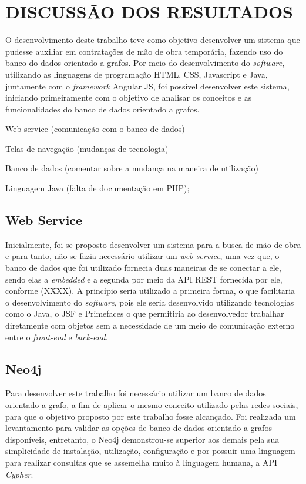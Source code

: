 
\chapter{DISCUSSÃO DOS RESULTADOS} 

\par O desenvolvimento deste trabalho teve como objetivo desenvolver um sistema que pudesse auxiliar em contratações de mão de obra temporária, fazendo uso do banco do dados orientado a grafos. Por meio do desenvolvimento do \textit{software}, utilizando as linguagens de programação HTML, CSS, Javascript e Java, juntamente com o \textit{framework} Angular JS, foi possível desenvolver este sistema, iniciando primeiramente com o objetivo de analisar os conceitos e as funcionalidades do banco de dados orientado a grafos.

\par Web service (comunicação com o banco de dados)
\par Telas de navegação (mudanças de tecnologia)
\par Banco de dados (comentar sobre a mudança na maneira de utilização)
\par Linguagem Java (falta de documentação em PHP);

\section{Web Service}

\par Inicialmente, foi-se proposto desenvolver um sistema para a busca de mão de obra e para tanto, não se fazia necessário utilizar um \textit{web service}, uma vez que, o banco de dados que foi utilizado fornecia duas maneiras de se conectar a ele, sendo elas a \textit{embedded} e a segunda por meio da API REST fornecida por ele, conforme (XXXX). A princípio seria utilizado a primeira forma, o que facilitaria o desenvolvimento do \textit{software}, pois ele seria desenvolvido utilizando tecnologias como o Java, o JSF e Primefaces o que permitiria ao desenvolvedor trabalhar diretamente com objetos sem a necessidade de um meio de comunicação externo entre o \textit{front-end} e \textit{back-end}.

\section{Neo4j}

\par Para desenvolver este trabalho foi necessário utilizar um banco de dados orientado a grafo, a fim de aplicar o mesmo conceito utilizado pelas redes sociais, para que o objetivo proposto por este trabalho fosse alcançado. Foi realizada um levantamento para validar as opções de banco de dados orientado a grafos disponíveis, entretanto, o Neo4j demonstrou-se superior aos demais pela sua simplicidade de instalação, utilização, configuração e por possuir uma linguagem para realizar consultas que se assemelha muito à linguagem humana, a API \textit{Cypher}.

